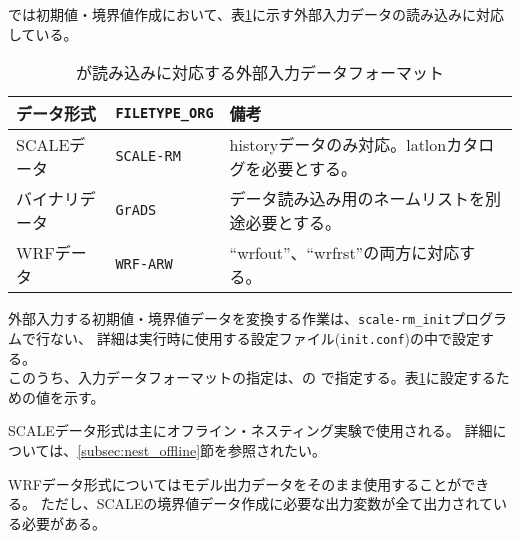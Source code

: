 \section{\SecAdvanceInputDataSetting} \label{sec:adv_datainput}

\scalerm では初期値・境界値作成において、表\ref{tab:inputdata_format}に示す外部入力データの読み込みに対応している。

\begin{table}[htb]
\begin{center}
\caption{\scalelib が読み込みに対応する外部入力データフォーマット}
\begin{tabularx}{150mm}{|l|l|X|} \hline
 \rowcolor[gray]{0.9} データ形式      & \verb|FILETYPE_ORG|  & 備考 \\ \hline
 SCALEデータ   & \verb|SCALE-RM|     & historyデータのみ対応。latlonカタログを必要とする。 \\ \hline
 バイナリデータ & \verb|GrADS|        & データ読み込み用のネームリストを別途必要とする。       \\ \hline
 WRFデータ     & \verb|WRF-ARW|      & ``wrfout''、``wrfrst''の両方に対応する。          \\ \hline
\end{tabularx}
\label{tab:inputdata_format}
\end{center}
\end{table}


外部入力する初期値・境界値データを変換する作業は、\verb|scale-rm_init|プログラムで行ない、
詳細は実行時に使用する設定ファイル(\verb|init.conf|)の中で設定する。\\
このうち、入力データフォーマットの指定は、の
で指定する。表\ref{tab:inputdata_format}に設定するための値を示す。

SCALEデータ形式は主にオフライン・ネスティング実験で使用される。
詳細については、\ref{subsec:nest_offline}節を参照されたい。


WRFデータ形式についてはモデル出力データをそのまま使用することができる。
ただし、SCALEの境界値データ作成に必要な出力変数が全て出力されている必要がある。

